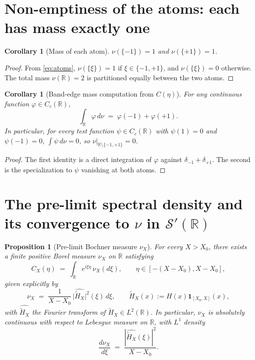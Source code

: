 \documentclass[11pt]{article}
\newtheorem{proposition}[theorem]{Proposition}
\newtheorem{corollary}[theorem]{Corollary}
\theoremstyle{definition}
\theoremstyle{remark}
\begin{document}
\section{Non-emptiness of the atoms: each has mass exactly one}

\begin{corollary}[Mass of each atom]\label{cor:mass}
$\nu(\{-1\})=1$ and $\nu(\{+1\})=1$.
\end{corollary}

\begin{proof}
From \eqref{eq:atoms}, $\nu(\{\xi\})=1$ if $\xi\in\{-1,+1\}$, and $\nu(\{\xi\})=0$ otherwise. The total mass $\nu(\mathbb{R})=2$ is partitioned equally between the two atoms.
\end{proof}

\begin{corollary}[Band-edge mass computation from $C(\eta)$]\label{cor:masscomp}
For any continuous function $\varphi\in C_c(\mathbb{R})$,
\begin{equation}\label{eq:phinu}
  \int_{\mathbb{R}}\varphi\,d\nu\;=\;\varphi(-1)+\varphi(+1).
\end{equation}
In particular, for every test function $\psi\in C_c(\mathbb{R})$ with $\psi(1)=0$ and $\psi(-1)=0$, $\int\psi\,d\nu=0$, so $\nu\big|_{\mathbb{R}\setminus\{-1,+1\}}=0$.
\end{corollary}

\begin{proof}
The first identity is a direct integration of $\varphi$ against $\delta_{-1}+\delta_{+1}$. The second is the specialization to $\psi$ vanishing at both atoms.
\end{proof}

\section{The pre-limit spectral density and its convergence to $\nu$ in $\mathcal{S}'(\mathbb{R})$}

\begin{proposition}[Pre-limit Bochner measure $\nu_X$]\label{prop:nuX}
For every $X>X_0$, there exists a finite positive Borel measure $\nu_X$ on $\mathbb{R}$ satisfying
\begin{equation}\label{eq:nuX}
  C_X(\eta)\;=\;\int_{\mathbb{R}}e^{i\xi\eta}\,\nu_X(d\xi),\qquad\eta\in[-(X-X_0),X-X_0],
\end{equation}
given explicitly by
\begin{equation}\label{eq:nuXformula}
  \nu_X\;=\;\frac{1}{X-X_0}\,\bigl|\widehat{\widetilde H_X}\bigr|^2(\xi)\,d\xi,\qquad\widetilde H_X(x):=H(x)\mathbf{1}_{[X_0,X]}(x),
\end{equation}
with $\widehat{\widetilde H_X}$ the Fourier transform of $\widetilde H_X\in L^2(\mathbb{R})$. In particular, $\nu_X$ is absolutely continuous with respect to Lebesgue measure on $\mathbb{R}$, with $L^1$ density
\[
  \frac{d\nu_X}{d\xi}\;=\;\frac{|\widehat{\widetilde H_X}(\xi)|^2}{X-X_0}.
\]
\end{proposition}
\end{document}
